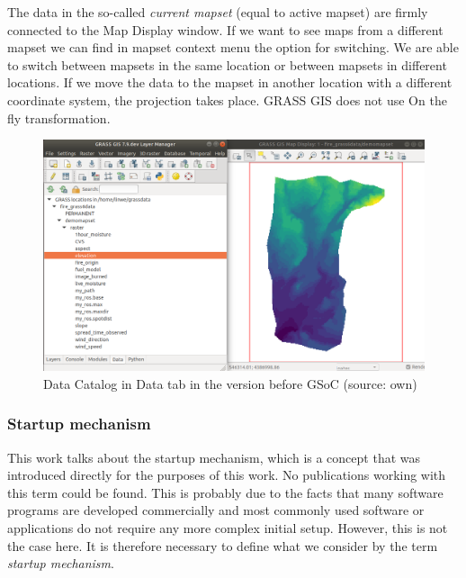 \documentclass[a4paper,10pt,twoside]{article}
\begin{document}
The data in the so-called \textit{current mapset} (equal to active mapset) are firmly connected to the Map Display window. If we want to see maps from a different mapset we can find in mapset context menu the option for switching. We are able to switch between mapsets in the same location or between mapsets in different locations. If we move the data to the mapset in another location with a different coordinate system, the projection takes place. GRASS GIS does not use On the fly transformation.

\vspace{0.3cm}
\begin{figure}[hbt!] 
\begin{center}
\includegraphics[width=15cm]{../pictures/data_catalog_pred.png} 
\caption[Data Catalog in Data tab (version before GSoC)]{Data Catalog in Data tab in the version before GSoC (source: own)}
\label{fig:data_catalog_pred}
\end{center}
\end{figure}



\newpage
\vspace*{-1cm}
\subsubsection{Startup mechanism}
\label{section:mechanism}
\noindent
\large
This work talks about the startup mechanism, which is a concept that was introduced directly for the purposes of this work. No publications working with this term could be found. This is probably due to the facts that many software programs are developed commercially and most commonly used software or applications do not require any more complex initial setup. However, this is not the case here. It is therefore necessary to define what we consider by the term \textit{startup mechanism}.
\end{document}
